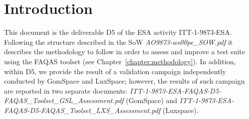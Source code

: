 
\chapter*{Introduction}
\label{sec:introduction}

This document is the deliverable D5 of the ESA activity ITT-1-9873-ESA. Following the structure described in the SoW \emph{AO9873-ws00pe\_SOW.pdf} it describes the methodology to follow in order to assess and improve a test suite using the FAQAS toolset (see Chapter~\ref{chapter:methodology}). In addition, within D5, we provide the result of a validation campaign independently conducted by GomSpace and LuxSpace; however, the results of such campaign are reported in two separate documents: \emph{ITT-1-9873-ESA-FAQAS-D5-FAQAS\_Toolset\_GSL\_Assessment.pdf} (GomSpace) and \emph{ITT-1-9873-ESA-FAQAS-D5-FAQAS\_Toolset\_LXS\_Assessment.pdf} (Luxspace).
 
